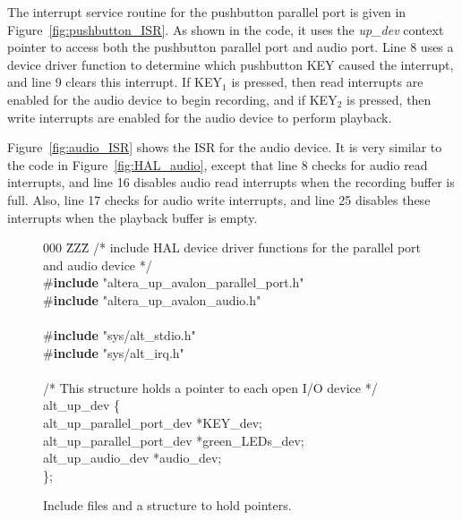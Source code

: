 \documentclass[11pt, twoside, pdftex]{article}
\begin{document}
The interrupt service routine for the pushbutton parallel port is given in Figure~\ref{fig:pushbutton_ISR}.
As shown in the code, it uses the {\it up\_dev} context pointer to access both the pushbutton parallel port and
audio port. Line 8 uses a device driver function to determine which pushbutton KEY caused the interrupt, and line 9
clears this interrupt. If KEY$_1$ is pressed, then read interrupts are enabled for the audio device to begin 
recording, and if KEY$_2$ is pressed, then write interrupts are enabled for the audio device to perform playback.

Figure~\ref{fig:audio_ISR} shows the ISR for the audio device. It is very similar to the code in 
Figure~\ref{fig:HAL_audio}, except that line 8 checks for audio read interrupts, and line 16 disables 
audio read interrupts when the recording buffer is full. Also, line 17 checks for audio write interrupts, 
and line 25 disables these interrupts when the playback buffer is empty.

\begin{figure}[h!]
\begin{center}
\begin{minipage}[t]{12.5 cm}
\begin{tabbing}
000 \=ZZZ\= \kill
\>/* include HAL device driver functions for the parallel port and audio device */\\
\>\#{\bf include} "altera\_up\_avalon\_parallel\_port.h"\\
\>\#{\bf include} "altera\_up\_avalon\_audio.h"\\
\\
\>\#{\bf include} "sys/alt\_stdio.h"\\
\>\#{\bf include} "sys/alt\_irq.h"\\
\\
\>/* This structure holds a pointer to each open I/O device */\\
 alt\_up\_dev \{\\
\>\>alt\_up\_parallel\_port\_dev *KEY\_dev;\\
\>\>alt\_up\_parallel\_port\_dev *green\_LEDs\_dev;\\
\>\>alt\_up\_audio\_dev *audio\_dev;\\
\>\};\\
\end{tabbing}
\end{minipage}
\end{center}
	\vspace{-0.33in}\caption{Include files and a structure to hold pointers.}
   \label{fig:globals_h}
\end{figure}
\end{document}
